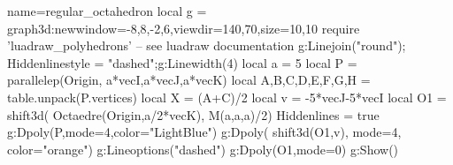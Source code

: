 \documentclass[12pt]{standalone}
\begin{document}
\begin{luadraw}{name=regular_octahedron}
local g = graph3d:new{window={-8,8,-2,6},viewdir={140,70},size={10,10}}
require 'luadraw_polyhedrons' -- see luadraw documentation 
g:Linejoin("round"); Hiddenlinestyle = "dashed";g:Linewidth(4)
local a = 5
local P = parallelep(Origin, a*vecI,a*vecJ,a*vecK)
local A,B,C,D,E,F,G,H = table.unpack(P.vertices)
local X = (A+C)/2
local v = -5*vecJ-5*vecI
local O1 = shift3d( Octaedre(Origin,a/2*vecK), M(a,a,a)/2)
Hiddenlines = true
g:Dpoly(P,{mode=4,color="LightBlue"})
g:Dpoly( shift3d(O1,v), {mode=4, color="orange"})
g:Lineoptions("dashed")
g:Dpoly(O1,{mode=0})
g:Show()
\end{luadraw}
\end{document}
